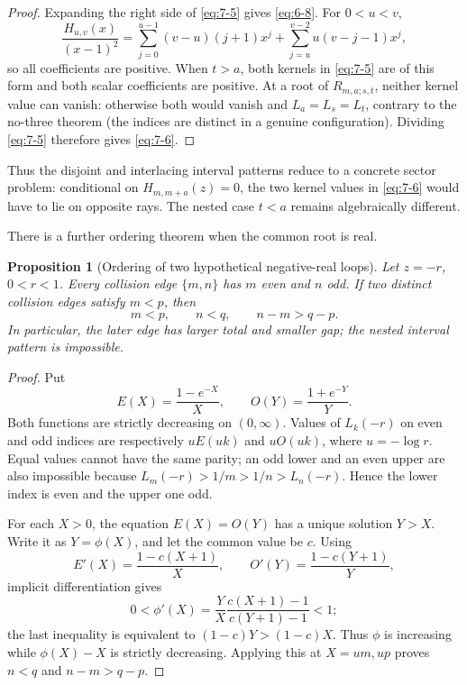 \documentclass[11pt]{article}
\numberwithin{equation}{section}
\newtheorem{proposition}[theorem]{Proposition}
\theoremstyle{definition}
\begin{document}
\begin{proof}
Expanding the right side of \eqref{eq:7-5} gives \eqref{eq:6-8}.  For \(0<u<v\),
\begin{equation}
 \frac{H_{u,v}(x)}{(x-1)^2}
 =\sum_{j=0}^{u-1}(v-u)(j+1)x^j
  +\sum_{j=u}^{v-2}u(v-j-1)x^j,
 \label{eq:7-7}
\end{equation}
so all coefficients are positive.  When \(t>a\), both kernels in
\eqref{eq:7-5} are of this form and both scalar coefficients are positive.
At a root of \(R_{m,a;s,t}\), neither kernel value can vanish:
otherwise both would vanish and \(L_a=L_s=L_t\), contrary to the
no-three theorem (the indices are distinct in a genuine configuration).
Dividing \eqref{eq:7-5} therefore gives \eqref{eq:7-6}.
\end{proof}

Thus the disjoint and interlacing interval patterns reduce to a concrete
sector problem: conditional on \(H_{m,m+a}(z)=0\), the two kernel values in
\eqref{eq:7-6} would have to lie on opposite rays.  The nested case \(t<a\)
remains algebraically different.

There is a further ordering theorem when the common root is real.

\begin{proposition}[Ordering of two hypothetical negative-real loops]
\label{prop:negativeorder}
Let \(z=-r\), \(0<r<1\).  Every collision edge \(\{m,n\}\) has
\(m\) even and \(n\) odd.  If two distinct collision edges satisfy
\(m<p\), then
\begin{equation}
 m<p,\qquad n<q,\qquad n-m>q-p.
 \label{eq:7-8}
\end{equation}
In particular, the later edge has larger total and smaller gap; the nested
interval pattern is impossible.
\end{proposition}

\begin{proof}
Put
\[
 E(X)=\frac{1-e^{-X}}{X},\qquad
 O(Y)=\frac{1+e^{-Y}}{Y}.
\]
Both functions are strictly decreasing on \((0,\infty)\).  Values of
\(L_k(-r)\) on even and odd indices are respectively
\(uE(uk)\) and \(uO(uk)\), where \(u=-\log r\).  Equal values cannot have
the same parity; an odd lower and an even upper are also impossible because
\(L_m(-r)>1/m>1/n>L_n(-r)\).  Hence the lower index is even and the upper
one odd.

For each \(X>0\), the equation \(E(X)=O(Y)\) has a unique solution
\(Y>X\).  Write it as \(Y=\phi(X)\), and let the common value be \(c\).
Using
\[
 E'(X)=\frac{1-c(X+1)}{X},\qquad
 O'(Y)=\frac{1-c(Y+1)}{Y},
\]
implicit differentiation gives
\[
 0<\phi'(X)
 =\frac{Y}{X}\frac{c(X+1)-1}{c(Y+1)-1}<1;
\]
the last inequality is equivalent to
\((1-c)Y>(1-c)X\).  Thus \(\phi\) is increasing while
\(\phi(X)-X\) is strictly decreasing.  Applying this at
\(X=um,up\) proves \(n<q\) and \(n-m>q-p\).
\end{proof}
\end{document}
